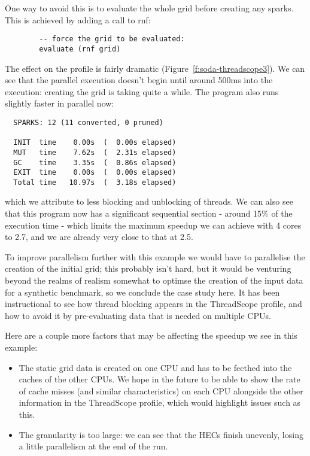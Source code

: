 \documentclass[twocolumn,9pt]{sigplanconf}
\newcommand{\codef}[1]{{\fontfamily{cmss}\small#1}}
\begin{document}
One way to avoid this is to evaluate the whole grid before creating
any sparks.  This is achieved by adding a call to \codef{rnf}:

\begin{lstlisting}
        -- force the grid to be evaluated:
        evaluate (rnf grid)
\end{lstlisting}

The effect on the profile is fairly dramatic
(Figure~\ref{f:soda-threadscope3}).  We can see that the parallel
execution doesn't begin until around 500ms into the execution:
creating the grid is taking quite a while.  The program also runs
slightly faster in parallel now:

\begin{verbatim}
  SPARKS: 12 (11 converted, 0 pruned)

  INIT  time    0.00s  (  0.00s elapsed)
  MUT   time    7.62s  (  2.31s elapsed)
  GC    time    3.35s  (  0.86s elapsed)
  EXIT  time    0.00s  (  0.00s elapsed)
  Total time   10.97s  (  3.18s elapsed)
\end{verbatim}
which we attribute to less blocking and unblocking of threads.  We can
also see that this program now has a significant sequential section -
around 15\% of the execution time - which limits the maximum speedup
we can achieve with 4 cores to 2.7, and we are already very close to
that at 2.5.

To improve parallelism further with this example we would have to
parallelise the creation of the initial grid; this probably isn't
hard, but it would be venturing beyond the realms of realism somewhat
to optimse the creation of the input data for a synthetic benchmark,
so we conclude the case study here.  It has been instructional to see
how thread blocking appears in the ThreadScope profile, and how to
avoid it by pre-evaluating data that is needed on multiple CPUs.

Here are a couple more factors that may be affecting the speedup we
see in this example:

\begin{itemize}
\item The static grid data is created on one CPU and has to be fecthed
  into the caches of the other CPUs.  We hope in the future to be able
  to show the rate of cache misses (and similar characteristics) on
  each CPU alongside the other information in the ThreadScope profile,
  which would highlight issues such as this.
\item The granularity is too large: we can see that the HECs finish
  unevenly, losing a little parallelism at the end of the run.
\end{itemize}
\end{document}
